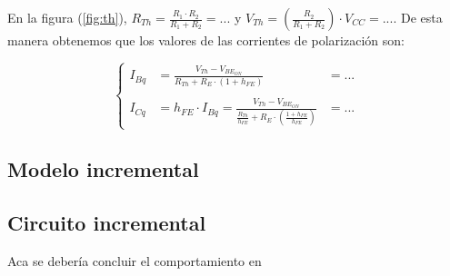 \documentclass[../../e1_tp1_main.tex]{subfiles}
\begin{document}
En la figura (\ref{fig:th}), $R_{Th} =\frac{R_1 \cdot R_2}{R_1+R_2} = ...$ y $V_{Th} = \left( \frac{R_2}{R_1 + R_2} \right) \cdot V_{CC} = ...$. De esta manera obtenemos que los valores de las corrientes de polarizaci\'on son:

	
 \[\left\{
\begin{aligned}
		I_{Bq} &=\frac{V_{Th}-V_{BE_{ON}}}{R_{Th} + R_E \cdot (1+h_{FE})} &= ... \\
		\\
		I_{Cq} &= h_{FE} \cdot I_{Bq} =  \frac{V_{Th}-V_{BE_{ON}}}{ \frac{R_{Th}}{h_{FE}} + R_E \cdot 						\left(\frac{1+h_{FE}}{h_{FE}}\right)} &= ...
 \end{aligned}
 \right.\]
 	
\subsection{Modelo incremental}

\subsection{Circuito incremental}

Aca se deber\'ia concluir el comportamiento en 
\end{document}
